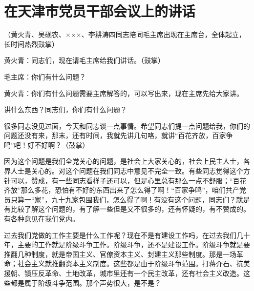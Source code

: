 \section[在天津市党员干部会议上的讲话（一九五七年三月十七日）]{在天津市党员干部会议上的讲话}


（黄火青、吴砚农、×××、李耕涛四同志陪同毛主席出现在主席台，全体起立，长时间热烈鼓掌）

黄火青：同志们，现在请毛主席给我们讲话。（鼓掌）

毛主席：你们有什么问题？

黄火青：你们有什么问题需要主席解答的，可以写出来，现在主席先给大家讲。

讲什么东西？同志们，你们有什么问题？

很多同志没见过面，今天和同志谈一点事情。希望同志们提一点问题给我，你们的问题还没有来，那末，还有时间，我就先讲几句咯，就讲“百花齐放，百家争鸣”吧！好不好啊？（鼓掌）

因为这个问题是我们全党关心的问题，是社会上大家关心的，社会上民主人士，各界人士是关心的。对这个问题在我们同志中意见不完全一致。有些同志觉得这个方针可以，赞成，有一些同志看样子还可以，但是心里总有那么一点不舒服；“百花齐放”那么多花，恐怕有不好的东西出来了怎么得了啊！“百家争鸣”，咱们共产党员只算一“家”，九十九家包围我们，怎么得了啊！有没有这个问题，同志们？就是有比较了解这个问题的，有了解一些但是又不很多的，还有怀疑的，有不赞成的。有各种意见在我们党内。

过去我们党做的工作主要是什么工作呢？现在不是有建设工作吗，在过去我们几十年，主要的工作就是阶级斗争工作。阶级斗争，还不是建设工作。阶级斗争就是要推翻几种制度，就是帝国主义、官僚资本主义、封建主义那些制度。那是一场革命；社会主义就推翻资本主义制度。这些都是由于阶级斗争范围。打蒋介石、抗美援朝、镇压反革命、土地改革，城市里还有一个民主改革，还有社会主义改造。这些都是属于阶级斗争范围。那个声势很大，是不是？

